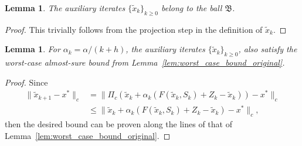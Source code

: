 \documentclass{article}
\newcommand{\lrp}[1]{\left( #1 \right)}
\newtheorem{lemma}[theorem]{Lemma}
\begin{document}
\begin{lemma}\label{lem:projiteratesinball}
    The auxiliary iterates $\{\tilde{x}_k\}_{k\geq 0}$ belong to the ball $\mathfrak B$.
\end{lemma}
\begin{proof}
    This trivially follows from the projection step in the definition of $\tilde{x}_k$. 
\end{proof}

\begin{lemma}\label{lem:worst_case_bound}
For $\alpha_k = \alpha/(k+h)$, the auxiliary iterates $\{\tilde{x}_k\}_{k\geq 0}$, also satisfy the worst-case almost-sure bound from Lemma~\ref{lem:worst_case_bound_original}.
\end{lemma}
\begin{proof} 
Since
\begin{align*}
    \|\tilde{x}_{k+1} - x^*\|_c 
    &= \| \Pi_c \lrp{ \tilde{x}_k + \alpha_k \lrp{ F(\tilde{x}_k, S_k) + Z_k - \tilde{x}_k } } - x^* \|_c\\
    &\le \|  \tilde{x}_k + \alpha_k \lrp{ F(\tilde{x}_k, S_k) + Z_k - \tilde{x}_k }  - x^* \|_c,
\end{align*}
then the desired bound can be proven along the lines of that of Lemma~\ref{lem:worst_case_bound_original}.
\end{proof}
\end{document}

